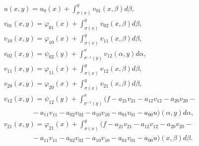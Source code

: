 \begin{equation}\label{15}


\begin{array}{l}


\displaystyle 


u(x,y)=u_{0}(x)+\int_{\sigma(x)}^{y} v_{01}(x,\beta)d\beta,\\[3mm]


\displaystyle 


v_{01}(x,y)=\varphi_{01}(x)+\int_{\sigma(x)}^{y}v_{02}(x,\beta)d\beta,\\[3mm]


\displaystyle 


v_{10}(x,y)=\varphi_{10}(x)+\int_{\sigma(x)}^{y}v_{11}(x,\beta)d\beta,\\[3mm]


\displaystyle 


v_{02}(x,y)=\psi_{02}(y)


+\int_{\sigma^{-1}(y)}^{x}v_{12}(\alpha,y)d\alpha,\\[3mm]


\displaystyle 


v_{11}(x,y)=\varphi_{11}(x)+\int_{\sigma(x)}^{y}v_{12}(x,\beta)d\beta,\\[3mm]


\displaystyle 


v_{20}(x,y)=\varphi_{20}(x)+\int_{\sigma(x)}^{y}v_{21}(x,\beta)d\beta,\\[3mm]


\displaystyle 


v_{12}(x,y)=\psi_{12}(y)+\int_{\sigma^{-1}(y)}^{x}


(f-a_{21}v_{21}-a_{12}v_{12}-a_{20}v_{20}-\\[3mm]


\qquad\qquad -a_{11}v_{11}-a_{02}v_{02}-a_{10}v_{10}-a_{01}v_{01}-a_{00}u)


(\alpha,y)d\alpha,\\[3mm]


\displaystyle 


v_{21}(x,y)=\varphi_{21}(x)+\int_{\sigma(x)}^{y}


(f-a_{21}v_{21}-a_{12}v_{12}-a_{20}v_{20}-\\[3mm]


\qquad\qquad -a_{11}v_{11}-a_{02}v_{02}-a_{10}v_{10}-a_{01}v_{01}-a_{00}u)


(x,\beta)d\beta.


\end{array}


\end{equation}


